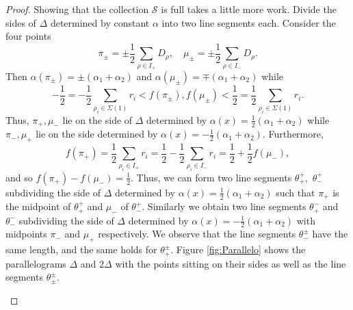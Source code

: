 \documentclass[reqno, 12pt]{amsart}
\theoremstyle{definition}
\numberwithin{equation}{section}
\begin{document}
\begin{proof}
Showing that the collection $\mathcal{S}$ is full takes a little more work. 
Divide the sides of $\Delta$ determined by constant $\alpha$ into two line segments each. Consider the four points \[
\pi_{\pm}=\pm\frac{1}{2}\sum_{\rho\in I_+}D_\rho,\quad \mu_{\pm}=\pm \frac{1}{2}\sum_{\rho\in I_-}D_\rho.
\]
Then $\alpha(\pi_{\pm})=\pm (\alpha_1+\alpha_2)$ and $\alpha(\mu_\pm)=\mp (\alpha_1+\alpha_2)$ while \[-\frac{1}{2}=-\frac{1}{2}\sum_{\rho_i\in \Sigma(1)}r_i<f(\pi_{\pm}), f(\mu_{\pm})<\frac{1}{2}=\frac{1}{2}\sum_{\rho_i\in\Sigma(1)}r_i. \]
Thus, $\pi_+, \mu_-$ lie on the side of $\Delta$ determined by $\alpha(x)=\frac{1}{2}(\alpha_1+\alpha_2)$ while $\pi_-,\mu_+$ lie on the side determined by $\alpha(x)=-\frac{1}{2}(\alpha_1+\alpha_2)$. Furthermore, \[
f(\pi_+)=\frac{1}{2}\sum_{\rho_i\in I_+}r_i=\frac{1}{2}-\frac{1}{2}\sum_{\rho_i\in I_-}r_i=\frac{1}{2}+\frac{1}{2}f(\mu_-),
\]
and so $f(\pi_+)-f(\mu_-)=\frac{1}{2}$. Thus, we can form two line segments $\theta_{+}^+,$ $\theta^+_-$ subdividing the side of $\Delta$ determined by $\alpha(x)=\frac{1}{2}(\alpha_1+\alpha_2)$ such that $\pi_+$ is the midpoint of $\theta^+_+$ and $\mu_-$ of $\theta_-^+$. Similarly we obtain two line segments $\theta^-_+$ and $\theta^-_-$ subdividing the side of $\Delta$ determined by $\alpha(x)=-\frac{1}{2}(\alpha_1+\alpha_2)$ with midpoints $\pi_-$ and $\mu_+$ respectively. We observe that the line segments $\theta_-^{\pm}$ have the same length, and the same holds for $\theta_+^{\pm}$. Figure \ref{fig:Parallelo} shows the parallelograms $\Delta$ and $2\Delta$ with the points sitting on their sides as well as the line segments $\theta_{\pm}^\pm$.




\begin{figure}[ht!]
\end{figure}
\end{proof}
\end{document}
